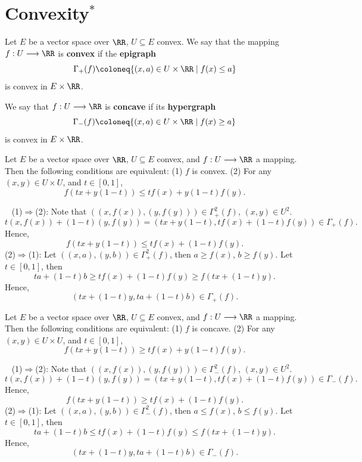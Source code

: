 \section{Convexity$^*$}
\begin{definitionenv}
    Let $E$ be a vector space over $\RR$, $U\subseteq E$ convex. We say that the mapping $f:U\longrightarrow \RR$ is \textbf{convex} if the \textbf{epigraph} 
    $$ \Gamma_+(f) \coloneq \{(x,a)\in U\times \RR\mid f(x)\le a\}$$
    is convex in $E\times \RR$.

    We say that $f:U\longrightarrow \RR$ is \textbf{concave} if its \textbf{hypergraph}
    $$ \Gamma_-(f) \coloneq \{(x,a)\in U\times \RR\mid  f(x)\ge a\}$$
    is convex in $E\times \RR$.
\end{definitionenv}
\begin{propositionenv}
    Let $E$ be a vector space over $\RR$, $U\subseteq E$ convex, and $f:U\longrightarrow \RR$ a mapping. Then the following conditions are equivalent:
    \newline
    (1) $f$ is convex.
    \newline
    (2) For any $(x,y)\in U\times U$, and $t\in [0,1]$,
    $$ f(tx+y(1-t))\le tf(x)+y(1-t)f(y).$$
\end{propositionenv}
\begin{proofenv}
    \ \newline
    (1)$\Rightarrow$(2): Note that $((x,f(x)), (y,f(y)))\in \Gamma_+^2(f)$, $(x,y)\in U^2$.
    $$ t(x,f(x))+(1-t)(y,f(y))=(tx+y(1-t),tf(x)+(1-t)f(y))\in \Gamma_+(f).$$
    Hence, 
    $$f(tx+y(1-t))\le tf(x)+(1-t)f(y).$$
    (2)$\Rightarrow$(1): Let $((x,a),(y,b))\in \Gamma_+^2(f)$, then $a\ge f(x)$, $b\ge f(y)$. Let $t\in [0,1]$, then
    $$ t a + (1-t)b\ge tf(x)+(1-t)f(y)\ge f(tx+(1-t)y).$$
    Hence, 
    $$ (tx+(1-t)y, ta+(1-t)b)\in \Gamma_+(f).$$
\end{proofenv}
\begin{propositionenv}
    Let $E$ be a vector space over $\RR$, $U\subseteq E$ convex, and $f:U\longrightarrow \RR$ a mapping. Then the following conditions are equivalent:
    \newline
    (1) $f$ is concave.
    \newline
    (2) For any $(x,y)\in U\times U$, and $t\in [0,1]$,
    $$ f(tx+y(1-t))\ge tf(x)+y(1-t)f(y).$$
\end{propositionenv}
\begin{proofenv}
    \ \newline
    (1)$\Rightarrow$(2): Note that $((x,f(x)), (y,f(y)))\in \Gamma_-^2(f)$, $(x,y)\in U^2$.
    $$ t(x,f(x))+(1-t)(y,f(y))=(tx+y(1-t),tf(x)+(1-t)f(y))\in \Gamma_-(f).$$
    Hence, 
    $$f(tx+y(1-t))\ge tf(x)+(1-t)f(y).$$
    (2)$\Rightarrow$(1): Let $((x,a),(y,b))\in \Gamma_-^2(f)$, then $a\le f(x)$, $b\le f(y)$. Let $t\in [0,1]$, then
    $$ t a + (1-t)b\le tf(x)+(1-t)f(y)\le f(tx+(1-t)y).$$
    Hence, 
    $$ (tx+(1-t)y, ta+(1-t)b)\in \Gamma_-(f).$$
\end{proofenv}
